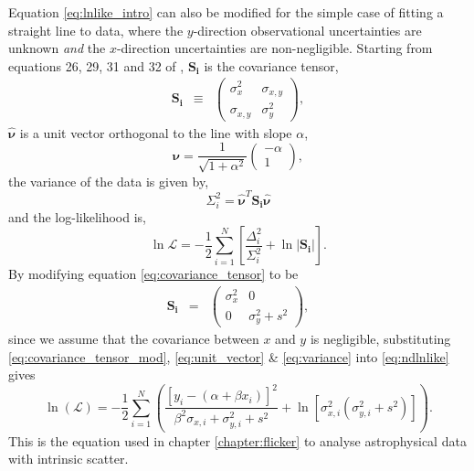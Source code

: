Equation \ref{eq:lnlike_intro} can also be modified for the simple case of
fitting a straight line to data, where the $y$-direction observational
uncertainties are unknown {\it and} the $x$-direction uncertainties are
non-negligible.
Starting from equations 26, 29, 31 and 32 of \citet{Hogg2010b},
$\mathbf{S_i}$ is the covariance tensor,
\begin{eqnarray}
    \mathbf{S_i} &\equiv& \left( \begin{array}{cc}
                    \sigma_{x}^2 & \sigma_{x,y} \\
                    \sigma_{x,y} & \sigma_{y}^2
\end{array}\right),
\end{eqnarray}
\label{eq:covariance_tensor}
$\mathbf{\hat{\nu}}$ is a unit vector orthogonal to the line with slope
$\alpha$,
\begin{equation}
    \mathbf{\hat{\nu}} = \frac{1}{\sqrt{1 + \alpha^2}} \left( \begin{array}{c}
                                                    -\alpha \\
                                                    1
    \end{array}\right),
\end{equation}
\label{eq:unit_vector}
the variance of the data is given by,
\begin{equation}
    \Sigma_i^2 = \mathbf{\hat{\nu}}^T \mathbf{S_i} \mathbf{\hat{\nu}}
\end{equation}
\label{eq:variance}
and the log-likelihood is,
\begin{equation}
    \ln\mathcal{L} = - \frac{1}{2} \sum_{i=1}^N \left[
    \frac{\Delta_i^2}{\Sigma_i^2} + \ln|\mathbf{S_i}| \right].
\end{equation}
\label{eq:ndlnlike}
By modifying equation \ref{eq:covariance_tensor} to be
\begin{eqnarray}
    \mathbf{S_i} &=& \left( \begin{array}{cc}
                    \sigma_{x}^2 & 0 \\
                    0 & \sigma_{y}^2 + s^2
\end{array}\right),
\end{eqnarray}
\label{eq:covariance_tensor_mod}
since we assume that the covariance between $x$ and $y$ is negligible,
substituting \ref{eq:covariance_tensor_mod}, \ref{eq:unit_vector} \&
\ref{eq:variance} into \ref{eq:ndlnlike} gives
\begin{equation}
    \ln(\mathcal{L}) = -\frac{1}{2} \sum_{i=1}^N
    \left( \frac{\left[ y_i - (\alpha + \beta x_i) \right]^2}
    {\beta^2\sigma_{x, i} + \sigma_{y, i}^2 + s^2} + \ln[\sigma_{x,
    i}^2(\sigma_{y, i}^2 + s^2)]
    \right).
\end{equation}
This is the equation used in chapter \ref{chapter:flicker} to analyse
astrophysical data with intrinsic scatter.

